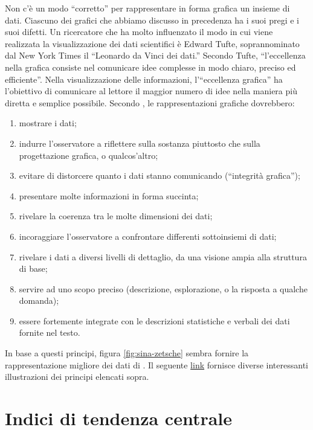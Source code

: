 \documentclass[
  10pt,
  italian,
  a4paper,
  extrafontsizes,onecolumn,openright
  ]{memoir}
\providecommand{\tightlist}{%
  \setlength{\itemsep}{0pt}\setlength{\parskip}{0pt}}
\theoremstyle{definition}
\theoremstyle{definition}
\theoremstyle{definition}
\theoremstyle{definition}
\theoremstyle{remark}
\begin{document}
Non c'è un modo ``corretto'' per rappresentare in forma grafica un insieme
di dati. Ciascuno dei grafici che abbiamo discusso in precedenza ha i suoi pregi e i suoi difetti. Un ricercatore che ha molto influenzato il modo in cui
viene realizzata la visualizzazione dei dati scientifici è Edward Tufte,
soprannominato dal New York Times il ``Leonardo da Vinci dei dati.''
Secondo Tufte, ``l'eccellenza nella grafica consiste nel comunicare idee
complesse in modo chiaro, preciso ed efficiente''. Nella visualizzazione
delle informazioni, l'``eccellenza grafica'' ha l'obiettivo di comunicare
al lettore il maggior numero di idee nella maniera più diretta e semplice possibile. Secondo \textcite{tufte_visual_display}, le rappresentazioni grafiche dovrebbero:

\begin{enumerate}
\def\labelenumi{\arabic{enumi}.}
\tightlist
\item
  mostrare i dati;
\item
  indurre l'osservatore a riflettere sulla sostanza piuttosto che
  sulla progettazione grafica, o qualcos'altro;
\item
  evitare di distorcere quanto i dati stanno comunicando (``integrità
  grafica'');
\item
  presentare molte informazioni in forma succinta;
\item
  rivelare la coerenza tra le molte dimensioni dei dati;
\item
  incoraggiare l'osservatore a confrontare differenti sottoinsiemi di dati;
\item
  rivelare i dati a diversi livelli di dettaglio, da una visione ampia
  alla struttura di base;
\item
  servire ad uno scopo preciso (descrizione, esplorazione, o la
  risposta a qualche domanda);
\item
  essere fortemente integrate con le descrizioni statistiche e verbali
  dei dati fornite nel testo.
\end{enumerate}

In base a questi principi, figura \ref{fig:sina-zetsche} sembra fornire la
rappresentazione migliore dei dati di \textcite{zetschefuture2019}. Il seguente \href{https://www.biostat.wisc.edu/~kbroman/presentations/graphs2018.pdf}{link} fornisce diverse interessanti illustrazioni dei principi elencati sopra.

\hypertarget{indici-di-tendenza-centrale}{%
\section{Indici di tendenza centrale}\label{indici-di-tendenza-centrale}}
\end{document}
